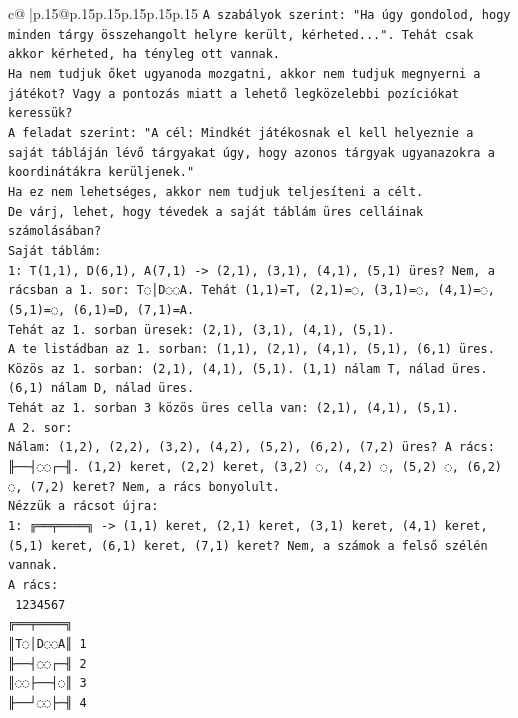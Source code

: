 \documentclass{article}
\begin{document}
{\begin{supertabular}{c@{$\;$}|p{.15\linewidth}@{}p{.15\linewidth}p{.15\linewidth}p{.15\linewidth}p{.15\linewidth}p{.15\linewidth}}
{{{\texttt{A szabályok szerint: "Ha úgy gondolod, hogy minden tárgy összehangolt helyre került, kérheted...". Tehát csak akkor kérheted, ha tényleg ott vannak.} \\
\texttt{Ha nem tudjuk őket ugyanoda mozgatni, akkor nem tudjuk megnyerni a játékot? Vagy a pontozás miatt a lehető legközelebbi pozíciókat keressük?} \\
\texttt{A feladat szerint: "A cél: Mindkét játékosnak el kell helyeznie a saját tábláján lévő tárgyakat úgy, hogy azonos tárgyak ugyanazokra a koordinátákra kerüljenek."} \\
\texttt{Ha ez nem lehetséges, akkor nem tudjuk teljesíteni a célt.} \\
\texttt{De várj, lehet, hogy tévedek a saját táblám üres celláinak számolásában?} \\
\texttt{Saját táblám:} \\
\texttt{1: T(1,1), D(6,1), A(7,1) {-}> (2,1), (3,1), (4,1), (5,1) üres? Nem, a rácsban a 1. sor: T◌│D◌◌A. Tehát (1,1)=T, (2,1)=◌, (3,1)=◌, (4,1)=◌, (5,1)=◌, (6,1)=D, (7,1)=A.} \\
\texttt{Tehát az 1. sorban üresek: (2,1), (3,1), (4,1), (5,1).} \\
\texttt{A te listádban az 1. sorban: (1,1), (2,1), (4,1), (5,1), (6,1) üres.} \\
\texttt{Közös az 1. sorban: (2,1), (4,1), (5,1). (1,1) nálam T, nálad üres. (6,1) nálam D, nálad üres.} \\
\texttt{Tehát az 1. sorban 3 közös üres cella van: (2,1), (4,1), (5,1).} \\
\texttt{A 2. sor:} \\
\texttt{Nálam: (1,2), (2,2), (3,2), (4,2), (5,2), (6,2), (7,2) üres? A rács: ╟──┤◌◌┌─╢. (1,2) keret, (2,2) keret, (3,2) ◌, (4,2) ◌, (5,2) ◌, (6,2) ◌, (7,2) keret? Nem, a rács bonyolult.} \\
\texttt{Nézzük a rácsot újra:} \\
\texttt{1: ╔══╤════╗ {-}> (1,1) keret, (2,1) keret, (3,1) keret, (4,1) keret, (5,1) keret, (6,1) keret, (7,1) keret? Nem, a számok a felső szélén vannak.} \\
\texttt{A rács:} \\
\texttt{ 1234567} \\
\texttt{╔══╤════╗} \\
\texttt{║T◌│D◌◌A║ 1} \\
\texttt{╟──┤◌◌┌─╢ 2} \\
\texttt{║◌◌├──┤◌║ 3} \\
\texttt{╟──┘◌◌├─╢ 4} \\
}}}
\end{supertabular}}
\end{document}
